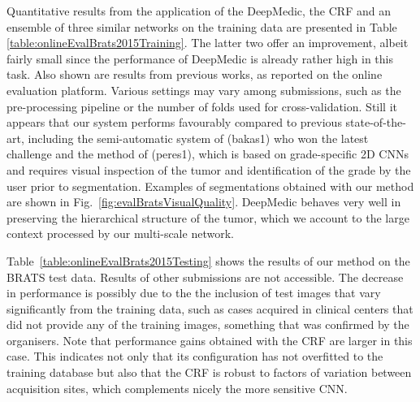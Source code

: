 Quantitative results from the application of the DeepMedic, the CRF and an ensemble of three similar networks on the training data are presented in Table \ref{table:onlineEvalBrats2015Training}. The latter two offer an improvement, albeit fairly small since the performance of DeepMedic is already rather high in this task. Also shown are results from previous works, as reported on the online evaluation platform. Various settings may vary among submissions, such as the pre-processing pipeline or the number of folds used for cross-validation. Still it appears that our system performs favourably compared to previous state-of-the-art, including the semi-automatic system of \cite{bakas2015Brats} (bakas1) who won the latest challenge and the method of \cite{pereira2015Brats} (peres1), which is based on grade-specific 2D CNNs and requires visual inspection of the tumor and identification of the grade by the user prior to segmentation. Examples of segmentations obtained with our method are shown in Fig.~\ref{fig:evalBratsVisualQuality}. DeepMedic behaves very well in preserving the hierarchical structure of the tumor, which we account to the large context processed by our multi-scale network.



Table~\ref{table:onlineEvalBrats2015Testing} shows the results of our method on the BRATS test data. Results of other submissions are not accessible. The decrease in performance is possibly due to the the inclusion of test images that vary significantly from the training data, such as cases acquired in clinical centers that did not provide any of the training images, something that was confirmed by the organisers. Note that performance gains obtained with the CRF are larger in this case. This indicates not only that its configuration has not overfitted to the training database but also that the CRF is robust to factors of variation between acquisition sites, which complements nicely the more sensitive CNN.


